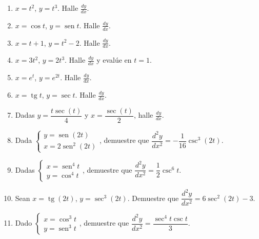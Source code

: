\documentclass[12pt, letterpaper]{article}
\begin{document}
\begin{enumerate}[leftmargin=*]

  \item \medio{} $x = t^2$, $y = t^3$. Halle $\frac{dy}{dx}$.

  \item \medio{} $x = \cos t$, $y = \operatorname{sen} t$. Halle $\frac{dy}{dx}$.

  \item \medio{} $x = t + 1$, $y = t^2 - 2$. Halle $\frac{dy}{dx}$.

  \item \medio{} $x = 3t^2$, $y = 2t^3$. Halle $\frac{dy}{dx}$ y evalúe en $t = 1$.

  \item \medio{} $x = e^{t}$, $y = e^{2t}$. Halle $\frac{dy}{dx}$.

  \item \medio{} $x = \operatorname{tg} t$, $y = \sec t$. Halle $\frac{dy}{dx}$.

  \item \medio{} Dadas $y = \dfrac{t\sec(t)}{4}$ y $x = \dfrac{\sec(t)}{2}$, halle $\frac{dy}{dx}$. %

  \item \dificil{} Dada $\begin{cases} y = \operatorname{sen}(2t) \\ x = 2\operatorname{sen}^2(2t) \end{cases}$, demuestre que $\dfrac{d^2y}{dx^2} = -\dfrac{1}{16}\csc^3(2t)$. %

  \item \dificil{} Dadas $\begin{cases} x = \operatorname{sen}^4 t \\ y = \cos^4 t \end{cases}$, demuestre que $\dfrac{d^2y}{dx^2} = \dfrac{1}{2}\csc^6 t$. %

  \item \dificil{} Sean $x = \operatorname{tg}(2t)$, $y = \sec^3(2t)$. Demuestre que $\dfrac{d^2y}{dx^2} = 6\sec^2(2t) - 3$. %

  \item \dificil{} Dado $\begin{cases} x = \cos^3 t \\ y = \operatorname{sen}^3 t \end{cases}$, demuestre que $\dfrac{d^2y}{dx^2} = \dfrac{\sec^4 t\csc t}{3}$. %


\end{enumerate}
\end{document}

